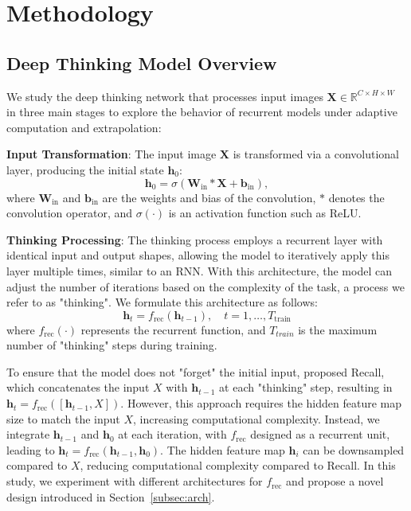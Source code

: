 \section{Methodology}
\subsection{Deep Thinking Model Overview}
We study the deep thinking network that processes input images $\mathbf{X} \in \mathbb{R}^{C \times H \times W}$ in three main stages to explore the behavior of recurrent models under adaptive computation and extrapolation:

\textbf{Input Transformation}: The input image $\mathbf{X}$ is transformed via a convolutional layer, producing the initial state $\mathbf{h}_0$:
   \begin{equation}
       \mathbf{h}_0 = \sigma(\mathbf{W}_\text{in} \ast \mathbf{X} + \mathbf{b}_\text{in}),
   \end{equation}
where \( \mathbf{W}_\text{in} \) and \( \mathbf{b}_\text{in} \) are the weights and bias of the convolution, \( \ast \) denotes the convolution operator, and \( \sigma(\cdot) \) is an activation function such as ReLU.
\label{input_transform}


\textbf{Thinking Processing}: The thinking process employs a recurrent layer with identical input and output shapes, allowing the model to iteratively apply this layer multiple times, similar to an RNN.
With this architecture, the model can adjust the number of iterations based on the complexity of the task, a process we refer to as "thinking". We formulate this architecture as follows:
\begin{equation}
   \mathbf{h}_t = f_\text{rec}(\mathbf{h}_{t-1}), \quad t = 1, \dots, T_\text{train}
\end{equation}
where \( f_\text{rec}(\cdot) \) represents the recurrent function, and $T_{train}$ is
the maximum number of "thinking" steps during training. 

To ensure that the model does not "forget" the initial input, \citet{bansal2022endtoend} proposed Recall, which concatenates the input \( X \) with \( \textbf{h}_{t-1} \) at each "thinking" step, resulting in \( \textbf{h}_t = f_{\text{rec}}([\textbf{h}_{t-1}, X]) \). 
However, this approach requires the hidden feature map size to match the input \( X \), increasing computational complexity. 
Instead, we integrate \( \textbf{h}_{t-1} \) and \( \textbf{h}_0 \) at each iteration, with \( f_{\text{rec}} \) designed as a recurrent unit, leading to \( \textbf{h}_t = f_{\text{rec}}(\textbf{h}_{t-1}, \textbf{h}_0) \). 
The hidden feature map \( \textbf{h}_i \) can be downsampled compared to \( X \), reducing computational complexity compared to Recall. 
In this study, we experiment with different architectures for \( f_{\text{rec}} \) and propose a novel design introduced in Section~\ref{subsec:arch}.

